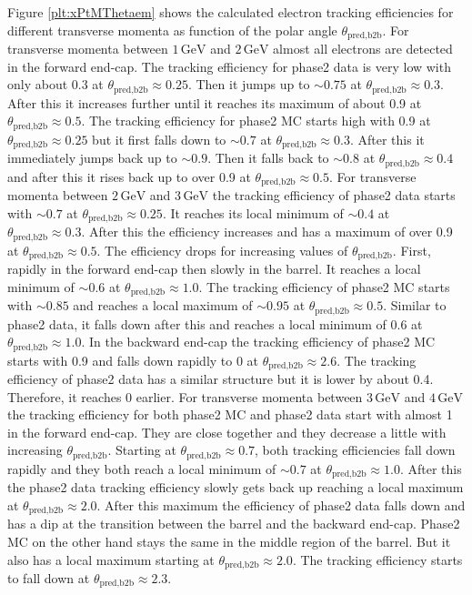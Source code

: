 \documentclass[a4paper,11pt,twosided,final,german,openbib,pdftex,listof=totoc,bibliography=totoc]{scrbook}
\begin{document}
Figure \ref{plt:xPtMThetaem} shows the calculated electron tracking efficiencies for different transverse momenta as function of the polar angle $\theta_{\textrm{pred,b2b}}$. For transverse momenta between $1\,\textrm{GeV}$ and $2\,\textrm{GeV}$ almost all electrons are detected in the forward end-cap.  The tracking efficiency for phase2 data is very low with only about 0.3 at $\theta_{\textrm{pred,b2b}} \approx 0.25$. Then it jumps up to $\sim 0.75$ at $\theta_{\textrm{pred,b2b}} \approx 0.3$. After this it increases further until it reaches its maximum of about 0.9 at $\theta_{\textrm{pred,b2b}} \approx 0.5$. The tracking efficiency for phase2 MC starts high with 0.9 at $\theta_{\textrm{pred,b2b}} \approx 0.25$ but it first falls down to $\sim 0.7$ at $\theta_{\textrm{pred,b2b}} \approx 0.3$. After this it immediately jumps back up to $\sim 0.9$. Then it falls back to $\sim 0.8$ at $\theta_{\textrm{pred,b2b}} \approx 0.4$ and after this it rises back up to over 0.9 at $\theta_{\textrm{pred,b2b}} \approx 0.5$.
For transverse momenta between $2\,\textrm{GeV}$ and $3\,\textrm{GeV}$ the tracking efficiency of phase2 data starts with $\sim 0.7$ at $\theta_{\textrm{pred,b2b}} \approx 0.25$. It reaches its local minimum of $\sim 0.4$ at $\theta_{\textrm{pred,b2b}} \approx 0.3$. After this the efficiency increases and has a maximum of over 0.9 at $\theta_{\textrm{pred,b2b}} \approx 0.5$. The efficiency drops for increasing values of $\theta_{\textrm{pred,b2b}}$. First, rapidly in the forward end-cap then slowly in the barrel. It reaches a local minimum of $\sim 0.6$ at $\theta_{\textrm{pred,b2b}} \approx 1.0$. The tracking efficiency of phase2 MC starts with $\sim  0.85$ and reaches a local maximum of $\sim 0.95$ at $\theta_{\textrm{pred,b2b}} \approx 0.5$. Similar to phase2 data, it falls down after this and reaches a local minimum of 0.6 at $\theta_{\textrm{pred,b2b}} \approx 1.0$. In the backward end-cap the tracking efficiency of phase2 MC starts with 0.9 and falls down rapidly to 0 at $\theta_{\textrm{pred,b2b}} \approx 2.6$. The tracking efficiency of phase2 data has a similar structure but it is lower by about 0.4. Therefore, it reaches 0 earlier.
For transverse momenta between $3\,\textrm{GeV}$ and $4\,\textrm{GeV}$ the tracking efficiency for both phase2 MC and phase2 data start with almost 1 in the forward end-cap. They are close together and they decrease a little with increasing $\theta_{\textrm{pred,b2b}}$. Starting at $\theta_{\textrm{pred,b2b}} \approx 0.7$, both tracking efficiencies fall down rapidly and they both reach a local minimum of $\sim 0.7$ at $\theta_{\textrm{pred,b2b}} \approx 1.0$. After this the phase2 data tracking efficiency slowly gets back up reaching a local maximum at $\theta_{\textrm{pred,b2b}} \approx 2.0$. After this maximum the efficiency of phase2 data falls down and has a dip at the transition between the barrel and the backward end-cap. Phase2 MC on the other hand stays the same in the middle region of the barrel. But it also has a local maximum starting at $\theta_{\textrm{pred,b2b}} \approx 2.0$. The tracking efficiency starts to fall down at $\theta_{\textrm{pred,b2b}} \approx 2.3$.
\end{document}
